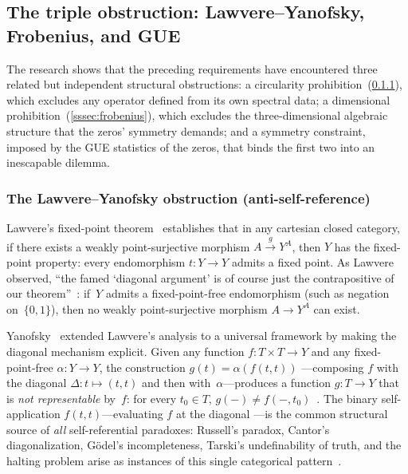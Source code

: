 \subsection{The triple obstruction: Lawvere--Yanofsky, Frobenius,
and GUE}\label{ssec:double-obstruction}

The research shows that the preceding requirements have encountered
three related but independent structural obstructions: a circularity
prohibition~(\cref{sssec:lawvere}), which excludes any operator
defined from its own spectral data; a dimensional
prohibition~(\cref{sssec:frobenius}), which excludes the
three-dimensional algebraic structure that the zeros' symmetry demands;
and a symmetry constraint, imposed by the GUE statistics of the zeros,
that binds the first two into an inescapable dilemma.

\subsubsection{The Lawvere--Yanofsky obstruction
(anti-self-reference)}\label{sssec:lawvere}

Lawvere's fixed-point theorem~\cite{lawvere69} establishes that in any
cartesian closed category, if there exists a weakly point-surjective
morphism $A \xrightarrow{g} Y^A$, then $Y$ has the fixed-point
property: every endomorphism $t: Y \to Y$ admits a fixed point.  As
Lawvere observed, ``the famed `diagonal argument' is of course just
the contrapositive of our theorem''~\cite{lawvere69}: if~$Y$ admits a
fixed-point-free endomorphism (such as negation on~$\{0,1\}$), then
no weakly point-surjective morphism $A \to Y^A$ can exist.

Yanofsky~\cite{yanofsky03} extended Lawvere's analysis to a universal
framework by making the diagonal mechanism explicit.  Given any
function $f: T \times T \to Y$ and any fixed-point-free
$\alpha: Y \to Y$, the construction
$g(t) = \alpha(f(t,t))$
---composing $f$ with the diagonal $\Delta: t \mapsto (t,t)$ and
then with~$\alpha$---produces a function $g: T \to Y$ that is
\emph{not representable} by~$f$: for every $t_0 \in T$,
$g(-) \neq f(-,t_0)$~\cite[Theorem~1]{yanofsky03}.
The binary self-application $f(t,t)$---evaluating $f$ at the diagonal
---is the common structural source of \emph{all} self-referential
paradoxes: Russell's paradox, Cantor's diagonalization, G\"odel's
incompleteness, Tarski's undefinability of truth, and the halting
problem arise as instances of this single categorical
pattern~\cite{yanofsky03}.

